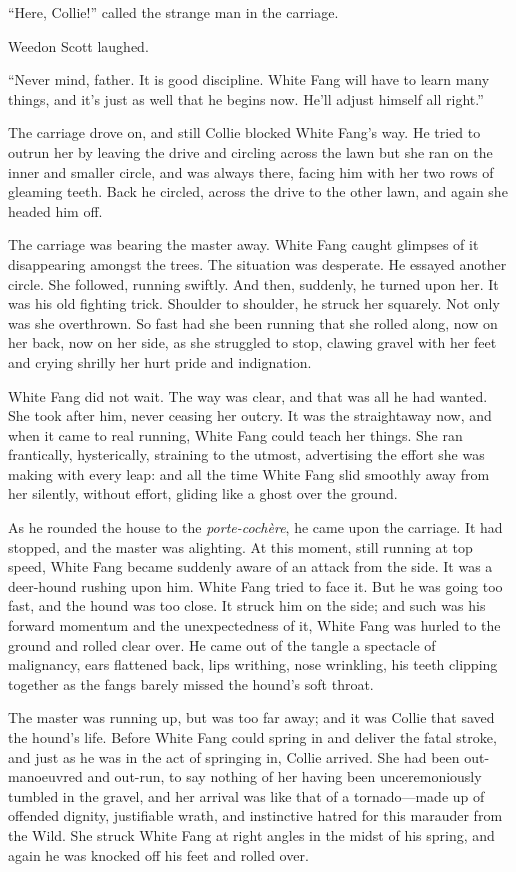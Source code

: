\documentclass[10pt]{book}
\begin{document}
“Here, Collie!” called the strange man in the carriage.

Weedon Scott laughed.

“Never mind, father. It is good discipline. White Fang will have to
learn many things, and it’s just as well that he begins now. He’ll
adjust himself all right.”

The carriage drove on, and still Collie blocked White Fang’s way. He
tried to outrun her by leaving the drive and circling across the lawn
but she ran on the inner and smaller circle, and was always there,
facing him with her two rows of gleaming teeth. Back he circled, across
the drive to the other lawn, and again she headed him off.

The carriage was bearing the master away. White Fang caught glimpses of
it disappearing amongst the trees. The situation was desperate. He
essayed another circle. She followed, running swiftly. And then,
suddenly, he turned upon her. It was his old fighting trick. Shoulder
to shoulder, he struck her squarely. Not only was she overthrown. So
fast had she been running that she rolled along, now on her back, now
on her side, as she struggled to stop, clawing gravel with her feet and
crying shrilly her hurt pride and indignation.

White Fang did not wait. The way was clear, and that was all he had
wanted. She took after him, never ceasing her outcry. It was the
straightaway now, and when it came to real running, White Fang could
teach her things. She ran frantically, hysterically, straining to the
utmost, advertising the effort she was making with every leap: and all
the time White Fang slid smoothly away from her silently, without
effort, gliding like a ghost over the ground.

As he rounded the house to the \emph{porte-cochère}, he came upon the
carriage. It had stopped, and the master was alighting. At this moment,
still running at top speed, White Fang became suddenly aware of an
attack from the side. It was a deer-hound rushing upon him. White Fang
tried to face it. But he was going too fast, and the hound was too
close. It struck him on the side; and such was his forward momentum and
the unexpectedness of it, White Fang was hurled to the ground and
rolled clear over. He came out of the tangle a spectacle of malignancy,
ears flattened back, lips writhing, nose wrinkling, his teeth clipping
together as the fangs barely missed the hound’s soft throat.

The master was running up, but was too far away; and it was Collie that
saved the hound’s life. Before White Fang could spring in and deliver
the fatal stroke, and just as he was in the act of springing in, Collie
arrived. She had been out-manoeuvred and out-run, to say nothing of her
having been unceremoniously tumbled in the gravel, and her arrival was
like that of a tornado—made up of offended dignity, justifiable wrath,
and instinctive hatred for this marauder from the Wild. She struck
White Fang at right angles in the midst of his spring, and again he was
knocked off his feet and rolled over.
\end{document}
